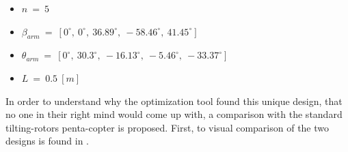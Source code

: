 {\scriptsize\begin{itemize}
  \item $n\ =\ 5$
  \item $\beta_{arm}\ =\ [0^{\circ},\  0^{\circ},\  36.89^{\circ},\  -58.46^{\circ},\   41.45^{\circ}]$
  \item $\theta_{arm}\ =\ [0^{\circ},\  30.3^{\circ},\  -16.13^{\circ},\  -5.46^{\circ},\  -33.37^{\circ}]$
  \item $L\ =\ 0.5\ [m]$
\end{itemize}}

In order to understand why the optimization tool found this unique design,
that no one in their right mind would come up with, a comparison with the
standard tilting-rotors penta-copter is proposed. First, to  visual comparison of the
two designs is found in .

